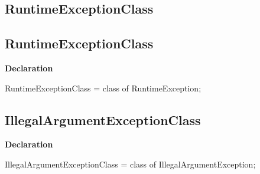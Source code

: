 \documentclass{report}
\newif\ifpdf
\begin{document}
\subsection*{\large{\textbf{RuntimeExceptionClass}}\normalsize\hspace{1ex}\hrulefill}
\else
\subsection*{RuntimeExceptionClass}
\fi
\label{NewPascal.Base-RuntimeExceptionClass}
\begin{list}{}{
\setlength{\itemindent}{0cm}
\setlength{\listparindent}{0cm}
\setlength{\leftmargin}{\evensidemargin}
\addtolength{\leftmargin}{\tmplength}
\settowidth{\labelsep}{X}
\addtolength{\leftmargin}{\labelsep}
\setlength{\labelwidth}{\tmplength}
}
\item[\textbf{Declaration}\hfill]
\ifpdf
\begin{flushleft}
\fi
\begin{ttfamily}
RuntimeExceptionClass = class of RuntimeException;\end{ttfamily}

\ifpdf
\end{flushleft}
\fi

\end{list}
\ifpdf
\subsection*{\large{\textbf{IllegalArgumentExceptionClass}}\normalsize\hspace{1ex}\hrulefill}
\else
\subsection*{IllegalArgumentExceptionClass}
\fi
\label{NewPascal.Base-IllegalArgumentExceptionClass}
\begin{list}{}{
\setlength{\itemindent}{0cm}
\setlength{\listparindent}{0cm}
\setlength{\leftmargin}{\evensidemargin}
\addtolength{\leftmargin}{\tmplength}
\settowidth{\labelsep}{X}
\addtolength{\leftmargin}{\labelsep}
\setlength{\labelwidth}{\tmplength}
}
\item[\textbf{Declaration}\hfill]
\ifpdf
\begin{flushleft}
\fi
\begin{ttfamily}
IllegalArgumentExceptionClass = class of IllegalArgumentException;\end{ttfamily}

\ifpdf
\end{flushleft}
\fi

\end{list}
\end{document}
